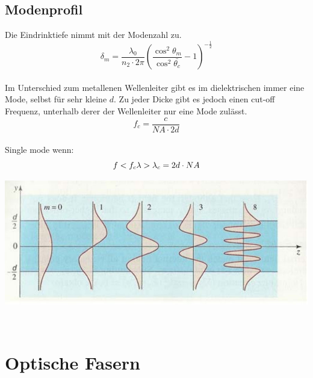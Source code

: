 \subsection{Modenprofil}
Die Eindrinktiefe nimmt mit der Modenzahl zu.\\
\[
	\delta_m=\frac{\lambda_0}{n_2 \cdot 2\pi}\left( \frac{\cos^2\theta_m}{\cos^2 \bar{\theta_c}} -1  \right)^{-\frac{1}{2}}
\]
\\
Im Unterschied zum metallenen Wellenleiter gibt es im dielektrischen immer eine Mode, selbst für sehr kleine $d$. Zu jeder Dicke gibt es jedoch einen cut-off Frequenz, unterhalb derer der Wellenleiter nur eine Mode zulässt.\\
\[
	f_c=\frac{c}{NA\cdot 2d}
\]
\\
Single mode wenn:
\[
	f<f_c \\
	\lambda > \lambda_c=2d\cdot NA
\]
\begin{center}
	\includegraphics[scale = 0.2]{../fig/modenprofil.jpg}
\end{center}
\
\section{Optische Fasern}
